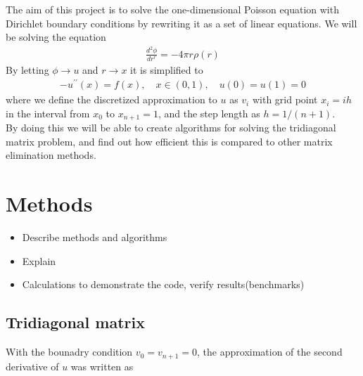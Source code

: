 \documentclass[12pt]{article}
\begin{document}
\noindent The aim of this project is to solve the one-dimensional Poisson equation with Dirichlet boundary conditions by rewriting it as a set of linear equations. We will be solving the equation
\begin{align*}
\frac{d^2\phi}{dr^r} = -4 \pi r \rho(r)
\end{align*}
\noindent By letting $\phi \rightarrow u$ and $r \rightarrow x$ it is simplified to
\begin{align*}
-u^{\prime \prime}(x) = f(x), \quad x \in (0,1), \quad  u(0) = u(1) = 0
\end{align*} 
where we define the discretized approximation to $u$ as $v_i$ with grid point $x_i = ih$ in the interval from $x_0$ to $x_{n+1} = 1$, and the step length as $h = 1/(n+1)$. \\

\noindent By doing this we will be able to create algorithms for solving the tridiagonal matrix problem, and find out how efficient this is compared to other matrix elimination methods. 


\section{Methods}

\begin{itemize}
\item Describe methods and algorithms
\item Explain
\item Calculations to demonstrate the code, verify results(benchmarks)
\end{itemize}

\subsection{Tridiagonal matrix}

\noindent With the bounadry condition $v_0 = v_{n+1} = 0$, the approximation of the second derivative of $u$ was written as 
\end{document}
